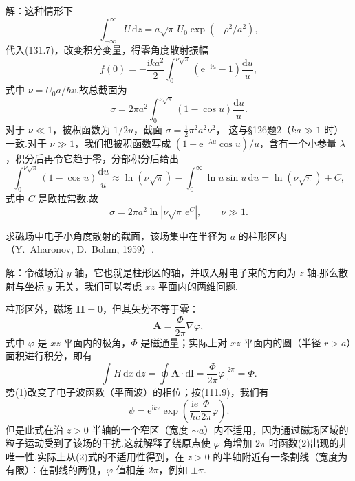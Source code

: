 \begin{xiti}
解：这种情形下
\begin{equation*}
  \int_{-\infty}^{\infty}U\,\mathrm{d}z
  =a\sqrt{\pi}\,U_0\exp(-\rho^2/a^2),
\end{equation*}
代入(131.7)，改变积分变量，得零角度散射振幅
\begin{equation*}
  f(0)=-\frac{\mathrm{i}ka^2}{2}\int_0^{\nu\sqrt{\pi}}
  \left(\mathrm{e}^{-\mathrm{i}u}-1\right)\frac{\mathrm{d}u}{u},
\end{equation*}
式中 $\nu=U_0a/\hbar v$.故总截面为
\begin{equation*}
  \sigma=2\pi a^2\int_0^{\nu\sqrt{\pi}}
  (1-\cos u)\frac{\mathrm{d}u}{u}.
\end{equation*}
对于 $\nu\ll1$，被积函数为 $1/2u$，截面
$\sigma=\frac{1}{2}\pi^2a^2\nu^2$，
这与§126题2（$ka\gg1$ 时）一致.对于 $\nu\gg1$，我们把被积函数写成
$(1-\mathrm{e}^{-\lambda u}\cos u)/u$，含有一个小参量 $\lambda$，积分后再令它趋于零，分部积分后给出
\begin{equation*}
  \int_0^{\nu\sqrt{\pi}}(1-\cos u)\frac{\mathrm{d}u}{u}
  \approx\ln(\nu\sqrt{\pi})
  -\int_0^{\infty}\ln u\sin u\,\mathrm{d}u
  =\ln(\nu\sqrt{\pi})+C,
\end{equation*}
式中 $C$ 是欧拉常数.故
\begin{equation*}
  \sigma=2\pi a^2\ln\left|\nu\sqrt{\pi}\,\mathrm{e}^{C}\right|,
  \qquad\nu\gg1.
\end{equation*}

\quad 求磁场中电子小角度散射的截面，该场集中在半径为 $a$ 的柱形区内（Y.~Aharonov, D.~Bohm, 1959）.

解：令磁场沿 $y$ 轴，它也就是柱形区的轴，并取入射电子束的方向为 $z$ 轴.那么散射与坐标 $y$ 无关，我们可以考虑 $xz$ 平面内的两维问题.

柱形区外，磁场 $\boldsymbol{H}=0$，但其矢势不等于零：
\setcounter{equation}{0}\renewcommand{\theequation}{\arabic{equation}}%
\begin{equation}
  \boldsymbol{A}=\frac{\Phi}{2\pi}\nabla\varphi,
\end{equation}
式中 $\varphi$ 是 $xz$ 平面内的极角，$\Phi$ 是磁通量；实际上对 $xz$ 平面内的圆（半径 $r>a$）面积进行积分，即有
\begin{equation*}
  \int H\,\mathrm{d}x\,\mathrm{d}z
  =\oint\boldsymbol{A}\cdot\mathrm{d}\boldsymbol{l}
  =\frac{\Phi}{2\pi}\varphi\bigg|_0^{2\pi}=\Phi.
\end{equation*}
势(1)改变了电子波函数（平面波）的相位；按(111.9)，我们有
\begin{equation}
  \psi=\mathrm{e}^{\mathrm{i}kz}
  \exp\left(\frac{\mathrm{i}e}{\hbar c}\frac{\Phi}{2\pi}\varphi\right).
\end{equation}
但是此式在沿 $z>0$ 半轴的一个窄区（宽度 $\sim a$）内不适用，因为通过磁场区域的粒子运动受到了该场的干扰.这就解释了绕原点使 $\varphi$ 角增加 $2\pi$ 时函数(2)出现的非唯一性.实际上从(2)式的不适用性得到，在 $z>0$ 的半轴附近有一条割线（宽度为有限）：在割线的两侧，$\varphi$ 值相差 $2\pi$，例如 $\pm\pi$.


\end{xiti}
